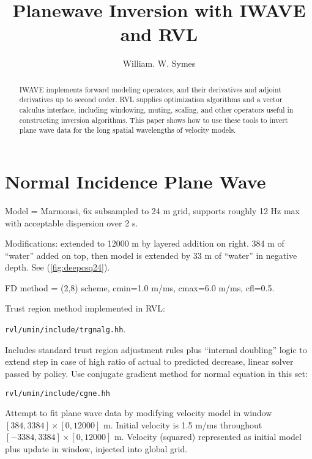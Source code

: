 \title{Planewave Inversion with IWAVE and RVL}
\author{William. W. Symes}

\address{The Rice Inversion Project,
Rice University,
Houston TX 77251-1892 USA, email {\tt symes@caam.rice.edu}.}

\maketitle
\parskip 12pt


\begin{abstract}
IWAVE implements forward modeling operators, and their derivatives and adjoint derivatives up to second order. RVL supplies optimization algorithms and a vector calculus interface, including windowing, muting, scaling, and other operators useful in constructing inversion algorithms. This paper shows how to use these tools to invert plane wave data for the long spatial wavelengths of velocity models.
\end{abstract}


\section{Normal Incidence Plane Wave}
Model = Marmousi, 6x subsampled to 24 m grid, supports roughly 12 Hz max with acceptable dispersion over 2 s.  

Modifications: extended to 12000 m by layered addition on right. 384 m of ``water'' added on top, then model is extended by 33 m of ``water'' in negative depth. See (\ref{fig:deepcsq24}).

FD method = (2,8) scheme, cmin=1.0 m/ms, cmax=6.0 m/ms, cfl=0.5.

Trust region method implemented in RVL:

{\tt rvl/umin/include/trgnalg.hh}.

 Includes standard trust region adjustment rules plus ``internal doubling'' logic to extend step in case of high ratio of actual to predicted decrease, linear solver passed by policy. Use conjugate gradient method for normal equation in this set:

{\tt rvl/umin/include/cgne.hh}

Attempt to fit plane wave data by modifying velocity model in window $[384,3384] \times [0, 12000]$ m. Initial velocity is 1.5 m/ms throughout $[-3384,3384] \times [0,12000]$ m. Velocity (squared) represented as initial model plus update in window, injected into global grid.

